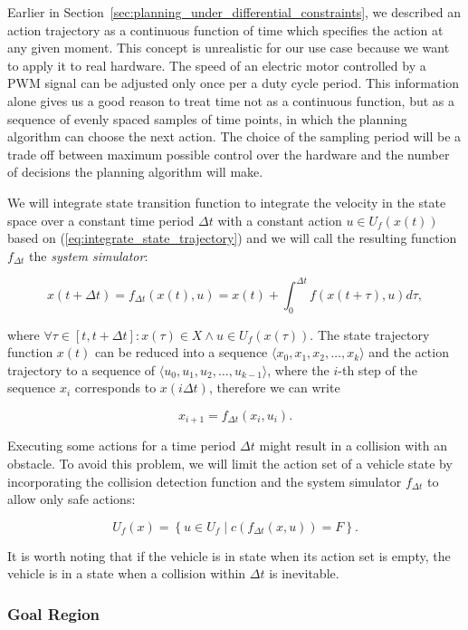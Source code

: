 Earlier in Section~\ref{sec:planning_under_differential_constraints}, we described an action trajectory as a continuous function of time which specifies the action at any given moment. This concept is unrealistic for our use case because we want to apply it to real hardware. The speed of an electric motor controlled by a \gls{PWM} signal can be adjusted only once per a duty cycle period. This information alone gives us a good reason to treat time not as a continuous function, but as a sequence of evenly spaced samples of time points, in which the planning algorithm can choose the next action. The choice of the sampling period will be a trade off between maximum possible control over the hardware and the number of decisions the planning algorithm will make.

We will integrate state transition function to integrate the velocity in the state space over a constant time period $\Delta t$ with a constant action $u\in U_f(x(t))$ based on (\ref{eq:integrate_state_trajectory}) and we will call the resulting function $f_{\Delta t}$ the \textit{system simulator}:

\begin{equation}
	x(t+\Delta t)=f_{\Delta t}(x(t), u)=x(t) + \int_{0}^{\Delta t} f\left(x(t+\tau), u \right) d\tau,
\end{equation}

where $\forall \tau \in [t, t+\Delta t]: x(\tau)\in X \wedge u\in U_f(x(\tau))$. The state trajectory function $x(t)$ can be reduced into a sequence $\langle x_0, x_1, x_2, \ldots, x_k\rangle$ and the action trajectory to a sequence of $\langle u_0, u_1, u_2, \ldots, u_{k-1}\rangle$, where the $i$-th step of the sequence $x_i$ corresponds to $x(i\Delta t)$, therefore we can write

\[
	x_{i+1}=f_{\Delta t}(x_i, u_i).
\]

Executing some actions for a time period $\Delta t$ might result in a collision with an obstacle. To avoid this problem, we will limit the action set of a vehicle state by incorporating the collision detection function and the system simulator $f_{\Delta t}$ to allow only safe actions:

\[
U_f(x)=\left\{u\in U_f \mid c(f_{\Delta t}(x, u)) = F\right\}.
\]

It is worth noting that if the vehicle is in state when its action set is empty, the vehicle is in a state when a collision within $\Delta t$ is inevitable.

\subsubsection{Goal Region}

